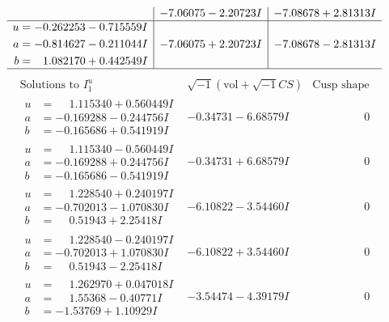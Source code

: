 \documentclass[1p]{elsarticle_modified}
\theoremstyle{definition}
\newcommand{\I}{\sqrt{-1}}
\begin{document}
$$\begin{array}{c|c|c}
 & -7.06075 - 2.20723 I & -7.08678 + 2.81313 I \\ \hline\begin{aligned}
u &= -0.262253 - 0.715559 I \\
a &= -0.814627 - 0.211044 I \\
b &= \phantom{-}1.082170 + 0.442549 I\end{aligned}
 & -7.06075 + 2.20723 I & -7.08678 - 2.81313 I\\
 \hline 
 \end{array}$$\newpage$$\begin{array}{c|c|c}  
\text{Solutions to }I^u_{1}& \I (\text{vol} + \sqrt{-1}CS) & \text{Cusp shape}\\
 \hline 
\begin{aligned}
u &= \phantom{-}1.115340 + 0.560449 I \\
a &= -0.169288 - 0.244756 I \\
b &= -0.165686 + 0.541919 I\end{aligned}
 & -0.34731 - 6.68579 I & \phantom{-0.000000 } 0 \\ \hline\begin{aligned}
u &= \phantom{-}1.115340 - 0.560449 I \\
a &= -0.169288 + 0.244756 I \\
b &= -0.165686 - 0.541919 I\end{aligned}
 & -0.34731 + 6.68579 I & \phantom{-0.000000 } 0 \\ \hline\begin{aligned}
u &= \phantom{-}1.228540 + 0.240197 I \\
a &= -0.702013 - 1.070830 I \\
b &= \phantom{-}0.51943 + 2.25418 I\end{aligned}
 & -6.10822 - 3.54460 I & \phantom{-0.000000 } 0 \\ \hline\begin{aligned}
u &= \phantom{-}1.228540 - 0.240197 I \\
a &= -0.702013 + 1.070830 I \\
b &= \phantom{-}0.51943 - 2.25418 I\end{aligned}
 & -6.10822 + 3.54460 I & \phantom{-0.000000 } 0 \\ \hline\begin{aligned}
u &= \phantom{-}1.262970 + 0.047018 I \\
a &= \phantom{-}1.55368 - 0.40771 I \\
b &= -1.53769 + 1.10929 I\end{aligned}
 & -3.54474 - 4.39179 I & \phantom{-0.000000 } 0 \\ \hline\begin{aligned}

\end{aligned}
\end{array}$$
\end{document}
